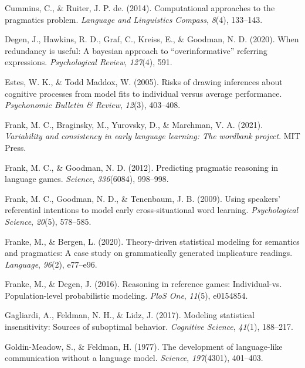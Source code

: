 \documentclass[
  man,floatsintext]{apa6}
\newlength{\cslhangindent}
\newlength{\cslentryspacingunit} %
\newenvironment{CSLReferences}[2] %
 {%
  \setlength{\parindent}{0pt}
  \ifodd #1
  \let\oldpar\par
  \def\par{\hangindent=\cslhangindent\oldpar}
  \fi
  \setlength{\parskip}{#2\cslentryspacingunit}
 }%
 {}
\begin{document}
\begin{CSLReferences}{1}{0}
\leavevmode{}%
Cummins, C., \& Ruiter, J. P. de. (2014). Computational approaches to the pragmatics problem. \emph{Language and Linguistics Compass}, \emph{8}(4), 133--143.

\leavevmode{}%
Degen, J., Hawkins, R. D., Graf, C., Kreiss, E., \& Goodman, N. D. (2020). When redundancy is useful: A bayesian approach to {``overinformative''} referring expressions. \emph{Psychological Review}, \emph{127}(4), 591.

\leavevmode{}%
Estes, W. K., \& Todd Maddox, W. (2005). Risks of drawing inferences about cognitive processes from model fits to individual versus average performance. \emph{Psychonomic Bulletin \& Review}, \emph{12}(3), 403--408.

\leavevmode{}%
Frank, M. C., Braginsky, M., Yurovsky, D., \& Marchman, V. A. (2021). \emph{Variability and consistency in early language learning: The wordbank project}. MIT Press.

\leavevmode{}%
Frank, M. C., \& Goodman, N. D. (2012). Predicting pragmatic reasoning in language games. \emph{Science}, \emph{336}(6084), 998--998.

\leavevmode{}%
Frank, M. C., Goodman, N. D., \& Tenenbaum, J. B. (2009). Using speakers' referential intentions to model early cross-situational word learning. \emph{Psychological Science}, \emph{20}(5), 578--585.

\leavevmode{}%
Franke, M., \& Bergen, L. (2020). Theory-driven statistical modeling for semantics and pragmatics: A case study on grammatically generated implicature readings. \emph{Language}, \emph{96}(2), e77--e96.

\leavevmode{}%
Franke, M., \& Degen, J. (2016). Reasoning in reference games: Individual-vs. Population-level probabilistic modeling. \emph{PloS One}, \emph{11}(5), e0154854.

\leavevmode{}%
Gagliardi, A., Feldman, N. H., \& Lidz, J. (2017). Modeling statistical insensitivity: Sources of suboptimal behavior. \emph{Cognitive Science}, \emph{41}(1), 188--217.

\leavevmode{}%
Goldin-Meadow, S., \& Feldman, H. (1977). The development of language-like communication without a language model. \emph{Science}, \emph{197}(4301), 401--403.


\end{CSLReferences}
\end{document}

